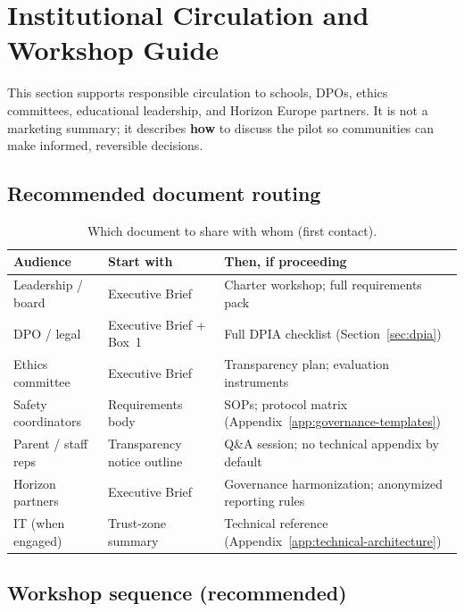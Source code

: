 \section{Institutional Circulation and Workshop Guide}
\label{sec:circulation-guide}

This section supports responsible circulation to schools, DPOs, ethics committees, educational
leadership, and Horizon Europe partners.
It is not a marketing summary; it describes \textbf{how} to discuss the pilot so communities can
make informed, reversible decisions.

\subsection{Recommended document routing}

\begin{table}[htbp]
  \centering
  \caption{Which document to share with whom (first contact).}
  \label{tab:document-routing}
  \small
  \begin{tabular}{@{}p{2.8cm}p{2.4cm}p{5.8cm}@{}}
    \toprule
    Audience & Start with & Then, if proceeding \\
    \midrule
    Leadership / board & Executive Brief & Charter workshop; full requirements pack \\
    DPO / legal & Executive Brief + Box~1 & Full DPIA checklist (Section~\ref{sec:dpia}) \\
    Ethics committee & Executive Brief & Transparency plan; evaluation instruments \\
    Safety coordinators & Requirements body & SOPs; protocol matrix (Appendix~\ref{app:governance-templates}) \\
    Parent / staff reps & Transparency notice outline & Q\&A session; no technical appendix by default \\
    Horizon partners & Executive Brief & Governance harmonization; anonymized reporting rules \\
    IT (when engaged) & Trust-zone summary & Technical reference (Appendix~\ref{app:technical-architecture}) \\
    \bottomrule
  \end{tabular}
\end{table}

\subsection{Workshop sequence (recommended)}

